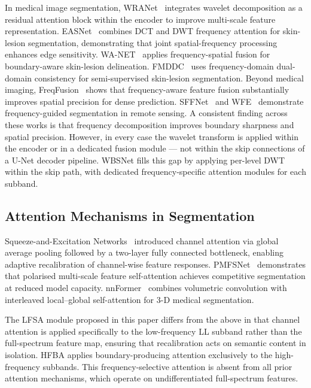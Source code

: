\documentclass[journal]{IEEEtran}
\begin{document}
In medical image segmentation, WRANet~\cite{wang2023wranet} integrates
wavelet decomposition as a residual attention block within the encoder to
improve multi-scale feature representation.
EASNet~\cite{easnet2025} combines DCT and DWT frequency attention for
skin-lesion segmentation, demonstrating that joint spatial-frequency processing
enhances edge sensitivity.
WA-NET~\cite{wanet2025} applies frequency-spatial fusion for boundary-aware
skin-lesion delineation.
FMDDC~\cite{dai2025fmddc} uses frequency-domain dual-domain consistency for
semi-supervised skin-lesion segmentation.
Beyond medical imaging, FreqFusion~\cite{li2024freqfusion} shows that
frequency-aware feature fusion substantially improves spatial precision for
dense prediction.
SFFNet~\cite{sffnet2024} and WFE~\cite{wfe2023} demonstrate frequency-guided
segmentation in remote sensing.
A consistent finding across these works is that frequency decomposition
improves boundary sharpness and spatial precision.
However, in every case the wavelet transform is applied within the encoder or
in a dedicated fusion module --- not within the skip connections of a U-Net
decoder pipeline.
WBSNet fills this gap by applying per-level DWT within the skip path, with
dedicated frequency-specific attention modules for each subband.

\subsection{Attention Mechanisms in Segmentation}

Squeeze-and-Excitation Networks~\cite{hu2018senet} introduced channel
attention via global average pooling followed by a two-layer fully connected
bottleneck, enabling adaptive recalibration of channel-wise feature responses.
PMFSNet~\cite{pmfsnet2024} demonstrates that polarised multi-scale feature
self-attention achieves competitive segmentation at reduced model capacity.
nnFormer~\cite{zhou2023nnformer} combines volumetric convolution with
interleaved local--global self-attention for 3-D medical segmentation.

The LFSA module proposed in this paper differs from the above in that channel
attention is applied specifically to the low-frequency LL subband rather than
the full-spectrum feature map, ensuring that recalibration acts on semantic
content in isolation.
HFBA applies boundary-producing attention exclusively to the high-frequency
subbands.
This frequency-selective attention is absent from all prior attention mechanisms,
which operate on undifferentiated full-spectrum features.
\end{document}

